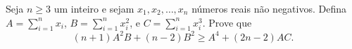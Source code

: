 Seja \(n \geq 3\) um inteiro e sejam \(x_1, x_2, \dots, x_n\) números reais não negativos.
Defina \(A = \sum_{i=1}^n x_i\), \(B = \sum_{i=1}^n x_i^2\), e \(C = \sum_{i=1}^n x_i^3\).
Prove que \[(n + 1)A^2B + (n - 2)B^2 \geq A^4 + (2n - 2)AC.\]
